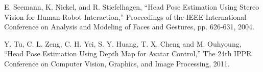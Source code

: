 \begin{thebibliography}{}
E. Seemann, K. Nickel, and R. Stiefelhagen, “Head Pose Estimation Using Stereo Vision for Human-Robot Interaction,” Proceedings of the IEEE International Conference on Analysis and Modeling of Faces and Gestures, pp. 626-631, 2004.

Y. Tu, C. L. Zeng, C. H. Yei, S. Y. Huang, T. X. Cheng and M. Ouhyoung, “Head Pose Estimation Using Depth Map for Avatar Control,” The 24th IPPR Conference on Computer Vision, Graphics, and Image Processing, 2011. 




\end{thebibliography}



